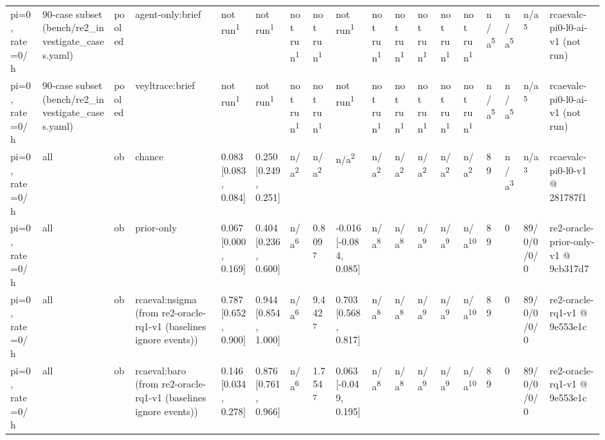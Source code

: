 \begin{table}[t]
\begin{tabular}{llllllllllllllllll}
pi=0, rate=0/h & 90-case subset (bench/re2\_investigate\_cases.yaml) & pooled & agent-only:brief & not run\textsuperscript{1} & not run\textsuperscript{1} & not run\textsuperscript{1} & not run\textsuperscript{1} & not run\textsuperscript{1} & not run\textsuperscript{1} & not run\textsuperscript{1} & not run\textsuperscript{1} & not run\textsuperscript{1} & not run\textsuperscript{1} & n/a\textsuperscript{5} & n/a\textsuperscript{5} & n/a\textsuperscript{5} & rcaevalc-pi0-l0-ai-v1 (not run) \\
pi=0, rate=0/h & 90-case subset (bench/re2\_investigate\_cases.yaml) & pooled & veyltrace:brief & not run\textsuperscript{1} & not run\textsuperscript{1} & not run\textsuperscript{1} & not run\textsuperscript{1} & not run\textsuperscript{1} & not run\textsuperscript{1} & not run\textsuperscript{1} & not run\textsuperscript{1} & not run\textsuperscript{1} & not run\textsuperscript{1} & n/a\textsuperscript{5} & n/a\textsuperscript{5} & n/a\textsuperscript{5} & rcaevalc-pi0-l0-ai-v1 (not run) \\
pi=0, rate=0/h & all & ob & chance & 0.083 [0.083, 0.084] & 0.250 [0.249, 0.251] & n/a\textsuperscript{2} & n/a\textsuperscript{2} & n/a\textsuperscript{2} & n/a\textsuperscript{2} & n/a\textsuperscript{2} & n/a\textsuperscript{2} & n/a\textsuperscript{2} & n/a\textsuperscript{2} & 89 & n/a\textsuperscript{3} & n/a\textsuperscript{3} & rcaevalc-pi0-l0-v1 @ 281787f1 \\
pi=0, rate=0/h & all & ob & prior-only & 0.067 [0.000, 0.169] & 0.404 [0.236, 0.600] & n/a\textsuperscript{6} & 0.809\textsuperscript{7} & -0.016 [-0.084, 0.085] & n/a\textsuperscript{8} & n/a\textsuperscript{8} & n/a\textsuperscript{9} & n/a\textsuperscript{9} & n/a\textsuperscript{10} & 89 & 0 & 89/0/0/0/0 & re2-oracle-prior-only-v1 @ 9cb317d7 \\
pi=0, rate=0/h & all & ob & rcaeval:nsigma (from re2-oracle-rq1-v1 (baselines ignore events)) & 0.787 [0.652, 0.900] & 0.944 [0.854, 1.000] & n/a\textsuperscript{6} & 9.442\textsuperscript{7} & 0.703 [0.568, 0.817] & n/a\textsuperscript{8} & n/a\textsuperscript{8} & n/a\textsuperscript{9} & n/a\textsuperscript{9} & n/a\textsuperscript{10} & 89 & 0 & 89/0/0/0/0 & re2-oracle-rq1-v1 @ 9e553e1c \\
pi=0, rate=0/h & all & ob & rcaeval:baro (from re2-oracle-rq1-v1 (baselines ignore events)) & 0.146 [0.034, 0.278] & 0.876 [0.761, 0.966] & n/a\textsuperscript{6} & 1.754\textsuperscript{7} & 0.063 [-0.049, 0.195] & n/a\textsuperscript{8} & n/a\textsuperscript{8} & n/a\textsuperscript{9} & n/a\textsuperscript{9} & n/a\textsuperscript{10} & 89 & 0 & 89/0/0/0/0 & re2-oracle-rq1-v1 @ 9e553e1c \\

\end{tabular}
\end{table}
